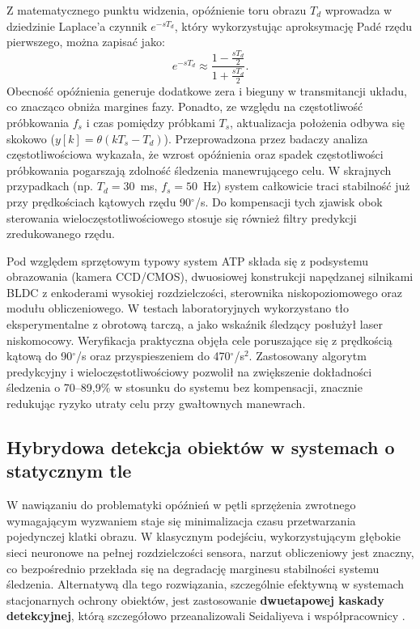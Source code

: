 \documentclass[a4paper,twoside,12pt]{book}
\begin{document}
Z matematycznego punktu widzenia, opóźnienie toru obrazu $T_{d}$ wprowadza w dziedzinie Laplace’a czynnik $e^{-sT_{d}}$, który wykorzystując aproksymację Padé rzędu pierwszego, można zapisać jako:
\begin{equation}
e^{-sT_{d}} \approx \frac{1 - \frac{sT_{d}}{2}}{1 + \frac{sT_{d}}{2}}.
\end{equation}
Obecność opóźnienia generuje dodatkowe zera i bieguny w transmitancji układu, co znacząco obniża margines fazy. Ponadto, ze względu na częstotliwość próbkowania $f_{s}$ i czas pomiędzy próbkami $T_{s}$, aktualizacja położenia odbywa się skokowo ($y[k] = \theta(kT_{s} - T_{d})$). Przeprowadzona przez badaczy analiza częstotliwościowa wykazała, że wzrost opóźnienia oraz spadek częstotliwości próbkowania pogarszają zdolność śledzenia manewrującego celu. W skrajnych przypadkach (np. $T_{d} = 30$~ms, $f_{s} = 50$~Hz) system całkowicie traci stabilność już przy prędkościach kątowych rzędu 90$^\circ$/s. Do kompensacji tych zjawisk obok sterowania wieloczęstotliwościowego stosuje się również filtry predykcji zredukowanego rzędu.

Pod względem sprzętowym typowy system ATP składa się z podsystemu obrazowania (kamera CCD/CMOS), dwuosiowej konstrukcji napędzanej silnikami BLDC z enkoderami wysokiej rozdzielczości, sterownika niskopoziomowego oraz modułu obliczeniowego. W testach laboratoryjnych wykorzystano tło eksperymentalne z obrotową tarczą, a jako wskaźnik śledzący posłużył laser niskomocowy. Weryfikacja praktyczna objęła cele poruszające się z prędkością kątową do 90$^\circ$/s oraz przyspieszeniem do 470$^\circ$/s$^2$. Zastosowany algorytm predykcyjny i wieloczęstotliwościowy pozwolił na zwiększenie dokładności śledzenia o 70--89,9\% w stosunku do systemu bez kompensacji, znacznie redukując ryzyko utraty celu przy gwałtownych manewrach.

\subsection{Hybrydowa detekcja obiektów w systemach o statycznym tle}

W nawiązaniu do problematyki opóźnień w pętli sprzężenia zwrotnego wymagającym wyzwaniem staje się minimalizacja czasu przetwarzania pojedynczej klatki obrazu. W klasycznym podejściu, wykorzystującym głębokie sieci neuronowe na pełnej rozdzielczości sensora, narzut obliczeniowy jest znaczny, co bezpośrednio przekłada się na degradację marginesu stabilności systemu śledzenia. Alternatywą dla tego rozwiązania, szczególnie efektywną w systemach stacjonarnych ochrony obiektów, jest zastosowanie \textbf{dwuetapowej kaskady detekcyjnej}, którą szczegółowo przeanalizowali Seidaliyeva i współpracownicy \cite{bib:Seidaliyeva2020}.
\end{document}
